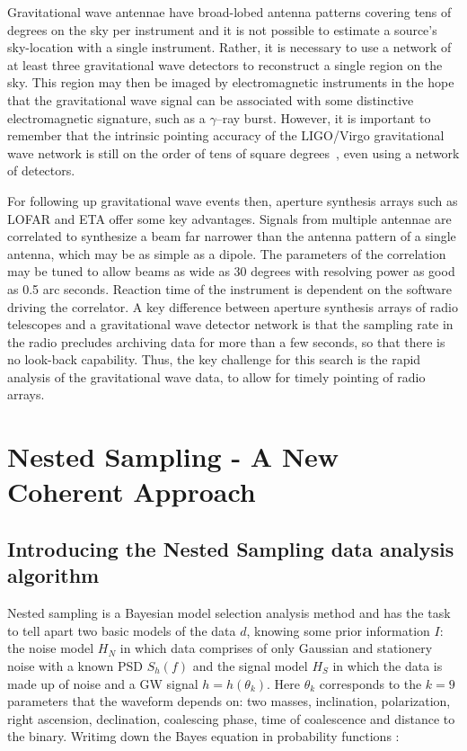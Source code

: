\documentclass[epsf]{article}
\begin{document}
Gravitational wave antennae have broad-lobed antenna patterns covering
tens of degrees on the sky per instrument and it is not possible to estimate
a source's sky-location with a single instrument.  Rather, it is necessary
to use a network of at least three gravitational wave detectors to reconstruct
a single region on the sky.  This region may then be imaged by electromagnetic
instruments in the hope that the gravitational wave signal can be associated
with some distinctive electromagnetic signature, such as a $\gamma$--ray
burst.  However, it is important to remember that the intrinsic pointing
accuracy of the LIGO/Virgo gravitational wave network is still on the order of
tens of square degrees~\cite{Fairhurst:2009tc}, even using a network of
detectors.  


For following up gravitational wave events then, aperture synthesis arrays such
as LOFAR and ETA offer some key advantages.  Signals from multiple antennae are
correlated to synthesize a beam far narrower than the antenna pattern of a
single antenna, which may be as simple as a dipole.  The parameters of the
correlation may be tuned to allow beams as wide as 30 degrees with resolving
power as good as 0.5 arc seconds. Reaction time of the instrument is dependent
on the software driving the correlator. A key difference between aperture
synthesis arrays of radio telescopes and a gravitational wave detector network
is that the sampling rate in the radio precludes archiving data for more than a
few seconds, so that there is no look-back capability.  Thus, the key challenge
for this search is the rapid analysis of the gravitational wave data, to allow
for timely pointing of radio arrays.



\section{Nested Sampling - A New Coherent Approach}

\subsection{Introducing the Nested Sampling data analysis algorithm}
 
 Nested sampling is a Bayesian model selection analysis method and has the task to tell apart two basic models of the data $d$, knowing some prior information $I$: the noise model $H_N$ in which data comprises of only Gaussian and stationery noise with a known PSD $S_h(f)$  and the signal model $H_S$ in which the data is made up of noise and a GW signal $h=h(\theta_k)$. Here $\theta_k$ corresponds to the $k=9$ parameters that the waveform depends on: two masses, inclination, polarization, right ascension, declination, coalescing phase, time of coalescence and distance to the binary. Writimg down the Bayes equation in probability functions \cite{skilling,veitch}:
\end{document}
